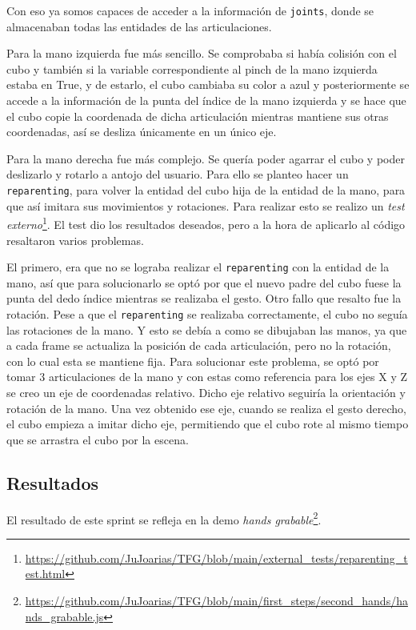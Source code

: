 \documentclass[a4paper, 12pt]{book}
\begin{document}
Con eso ya somos capaces de acceder a la información de \texttt{joints}, donde se almacenaban todas las entidades de las articulaciones.

Para la mano izquierda fue más sencillo. Se comprobaba si había colisión con el cubo y también si la variable correspondiente al pinch de la mano izquierda estaba en True, y de estarlo, el cubo cambiaba su color a azul y posteriormente se accede a la información 
de la punta del índice de la mano izquierda y se hace que el cubo copie la coordenada de dicha articulación mientras mantiene sus otras coordenadas, así se desliza únicamente en un único eje.

Para la mano derecha fue más complejo. Se quería poder agarrar el cubo y poder deslizarlo y rotarlo a antojo del usuario. Para ello se planteo hacer un \texttt{reparenting}, para volver la entidad del cubo hija de la entidad de la mano, para que así imitara sus movimientos y rotaciones. Para realizar esto se realizo un \textit{test externo}\footnote{\url{https://github.com/JuJoarias/TFG/blob/main/external_tests/reparenting_test.html}}.
El test dio los resultados deseados, pero a la hora de aplicarlo al código resaltaron varios problemas. 

El primero, era que no se lograba realizar el \texttt{reparenting} con la entidad de la mano, así que para solucionarlo se optó por que el nuevo padre del cubo fuese la punta del dedo índice mientras se realizaba el gesto.
Otro fallo que resalto fue la rotación. Pese a que el \texttt{reparenting} se realizaba correctamente, el cubo no seguía las rotaciones de la mano. Y esto se debía a como se dibujaban las manos, ya que a cada frame se actualiza la posición de cada articulación, pero no la rotación, con lo cual esta se mantiene fija. Para solucionar este problema, se optó por tomar 3 articulaciones de la mano y con estas 
como referencia para los ejes X y Z se creo un eje de coordenadas relativo. Dicho eje relativo seguiría la orientación y rotación de la mano. Una vez obtenido ese eje, cuando se realiza el gesto derecho, el cubo empieza a imitar dicho eje, permitiendo que el cubo rote al mismo tiempo que se arrastra el cubo por la escena. 

\subsection{Resultados}
\label{subsec:resultados5}
El resultado de este sprint se refleja en la demo \textit{hands grabable}\footnote{\url{https://github.com/JuJoarias/TFG/blob/main/first_steps/second_hands/hands_grabable.js}}. 
\end{document}
